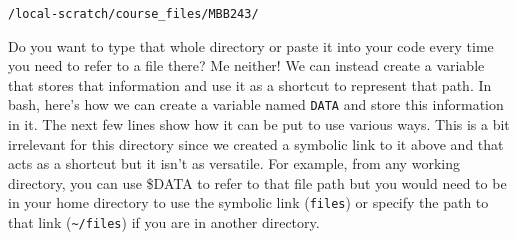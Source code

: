 \documentclass[
]{article}
\newenvironment{Shaded}{\begin{snugshade}}{\end{snugshade}}
\newcommand{\AlertTok}[1]{\textcolor[rgb]{0.94,0.16,0.16}{#1}}
\newcommand{\AttributeTok}[1]{\textcolor[rgb]{0.77,0.63,0.00}{#1}}
\newcommand{\BuiltInTok}[1]{#1}
\newcommand{\CommentTok}[1]{\textcolor[rgb]{0.56,0.35,0.01}{\textit{#1}}}
\newcommand{\FunctionTok}[1]{\textcolor[rgb]{0.00,0.00,0.00}{#1}}
\newcommand{\NormalTok}[1]{#1}
\newcommand{\OperatorTok}[1]{\textcolor[rgb]{0.81,0.36,0.00}{\textbf{#1}}}
\newcommand{\StringTok}[1]{\textcolor[rgb]{0.31,0.60,0.02}{#1}}
\newcommand{\VariableTok}[1]{\textcolor[rgb]{0.00,0.00,0.00}{#1}}
\begin{document}
\texttt{/local-scratch/course\_files/MBB243/}

Do you want to type that whole directory or paste it into your code
every time you need to refer to a file there? Me neither! We can instead
create a variable that stores that information and use it as a shortcut
to represent that path. In bash, here's how we can create a variable
named \texttt{DATA} and store this information in it. The next few lines
show how it can be put to use various ways. This is a bit irrelevant for
this directory since we created a symbolic link to it above and that
acts as a shortcut but it isn't as versatile. For example, from any
working directory, you can use \$DATA to refer to that file path but you
would need to be in your home directory to use the symbolic link
(\texttt{files}) or specify the path to that link
(\texttt{\textasciitilde{}/files}) if you are in another directory.

\begin{Shaded}
\end{Shaded}
\end{document}
